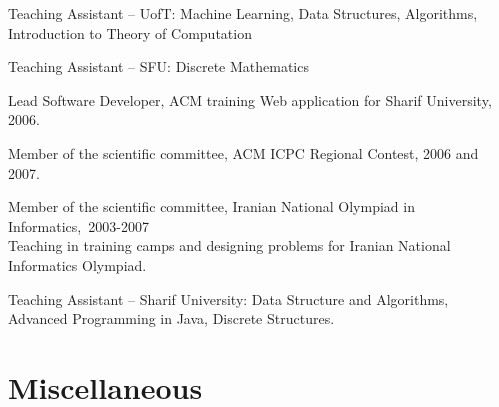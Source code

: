 \documentclass[10pt,letterpaper]{article}
\renewenvironment{itemize}{
  \begin{list}{}{
    \setlength{\leftmargin}{1.5em}
  }
}{
  \end{list}
}
\begin{document}
\begin{itemize}
\item Teaching Assistant -- UofT: Machine Learning, Data Structures,
  Algorithms, Introduction to Theory of Computation
\item Teaching Assistant -- SFU: Discrete Mathematics
\item Lead Software Developer, ACM training Web application for %
Sharif University, 2006.

\item Member of the scientific committee, ACM ICPC Regional Contest, 2006 and 2007.

\item Member of the scientific committee, Iranian National Olympiad in Informatics,~2003-2007 \\
  Teaching in training camps and designing problems
  for Iranian National Informatics Olympiad.

\item Teaching Assistant -- Sharif University: Data Structure and
  Algorithms, Advanced Programming in Java, Discrete Structures.
\end{itemize}

\section*{Miscellaneous}
\end{document}
